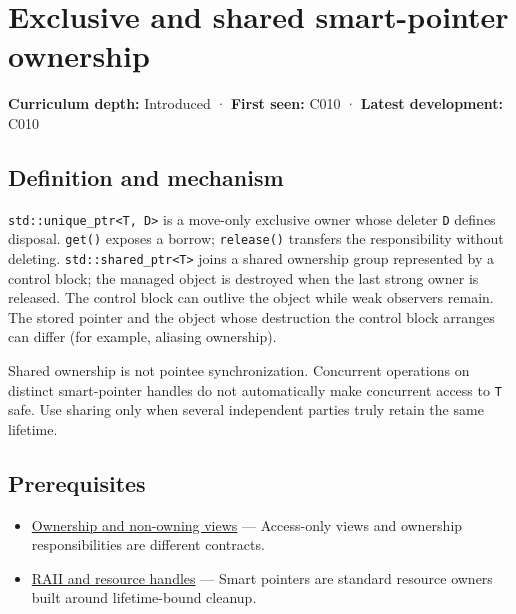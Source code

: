 \hypertarget{appendix-51602cabe815}{}\label{referencestart:appendix-51602cabe815}
\section{Exclusive and shared smart-pointer ownership}\label{appendix-51602cabe815-exclusive-and-shared-smart-pointer-ownership}

\textbf{Curriculum depth:} Introduced · \textbf{First seen:} C010 · \textbf{Latest development:} C010

\begin{allmightroledefinition}

\subsection{Definition and mechanism}\label{appendix-51602cabe815-definition-and-mechanism}

\texttt{std::unique\_ptr\textless{}T,\ D\textgreater{}} is a move-only exclusive owner whose deleter \texttt{D} defines disposal. \texttt{get()} exposes a borrow; \texttt{release()} transfers the responsibility without deleting. \texttt{std::shared\_ptr\textless{}T\textgreater{}} joins a shared ownership group represented by a control block; the managed object is destroyed when the last strong owner is released. The control block can outlive the object while weak observers remain. The stored pointer and the object whose destruction the control block arranges can differ (for example, aliasing ownership).

\end{allmightroledefinition}

Shared ownership is not pointee synchronization. Concurrent operations on distinct smart-pointer handles do not automatically make concurrent access to \texttt{T} safe. Use sharing only when several independent parties truly retain the same lifetime.

\subsection{Prerequisites}\label{appendix-51602cabe815-prerequisites}

\begin{itemize}
\tightlist
\item
  \hyperref[appendix-d52e4486f527]{Ownership and non-owning views} --- Access-only views and ownership responsibilities are different contracts.
\item
  \hyperref[appendix-69739d3ab49b]{RAII and resource handles} --- Smart pointers are standard resource owners built around lifetime-bound cleanup.
\end{itemize}

